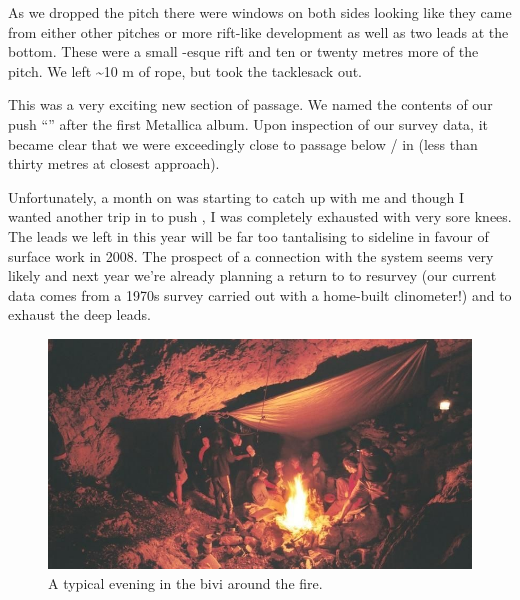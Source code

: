 As we dropped the pitch there were windows on both sides looking like
they came from either other pitches or more rift-like development as
well as two leads at the bottom. These were a small -esque rift and ten or twenty metres more of the pitch. We left
\textasciitilde{}10 m of rope, but took the tacklesack out.

This was a very exciting new section of passage. We named the contents
of our push ``'' after the first Metallica album. Upon
inspection of our survey data, it became clear that we were exceedingly
close to passage below / in  (less than thirty
metres at closest approach).

Unfortunately, a month on  was starting to catch up with me and
though I wanted another trip in  to push , I
was completely exhausted with very sore knees. The leads we left in
 this year will be far too tantalising to sideline in favour of
surface work in 2008. The prospect of a connection with the system seems
very likely and next year we're already planning a return to 
to resurvey (our current data comes from a 1970s survey carried out with
a home-built clinometer!) and to exhaust the deep leads.


\begin{figure}
\checkoddpage \ifoddpage \forcerectofloat \else \forceversofloat \fi
   \centering
\includegraphics[width = \textwidth]{2007/kangaroo/jarvist frost gr1 film2 -031_28.jpg}
\caption{A typical evening in the bivi around the fire. }
\end{figure}

